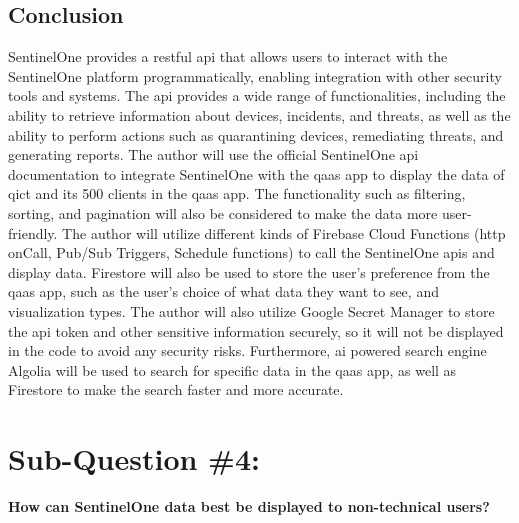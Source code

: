 \subsection{Conclusion}
SentinelOne provides a \acrshort{rest}ful \acrshort{api} that allows users to interact with the SentinelOne platform
programmatically, enabling integration with other security tools and systems. The \acrshort{api} provides a wide range of
functionalities, including the ability to retrieve information about devices, incidents, and threats, as well as the ability
to perform actions such as quarantining devices, remediating threats, and generating reports. The author will use the official
SentinelOne \acrshort{api} documentation to integrate SentinelOne with the \acrshort{qaas} app to display the data of
\acrshort{qict} and its 500 clients in the \acrshort{qaas} app. The functionality such as filtering, sorting, and pagination
will also be considered to make the data more user-friendly. The author will utilize different kinds of Firebase Cloud
Functions (\acrshort{http} onCall, Pub/Sub Triggers, Schedule functions) to call the SentinelOne \acrshort{api}s and display
data. Firestore will also be used to store the user's preference from the \acrshort{qaas} app, such as the user's choice of
what data they want to see, and visualization types. The author will also utilize Google Secret Manager to store the
\acrshort{api} token and other sensitive information securely, so it will not be displayed in the code to avoid any security
risks. Furthermore, \acrshort{ai} powered search engine Algolia will be used to search for specific data in the \acrshort{qaas} app,
as well as Firestore to make the search faster and more accurate.

\section{Sub-Question \#4:}

\textbf{How can SentinelOne data best be displayed to non-technical users?}


